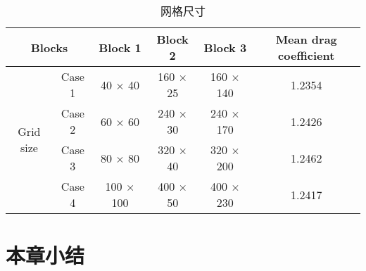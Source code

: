 \begin{table}[]
	\centering
	\caption{网格尺寸}\label{tab: grid}
	\begin{tabular}{@{}cccccc@{}}
		\toprule
		\multicolumn{2}{c}{Blocks}  & Block 1  & Block 2   & Block 3 & Mean drag coefficient    \\ \midrule
		\multirow{4}{*}{Grid size} 
		& Case 1 & 40 $\times$ 40 & 160 $\times$ 25 & 160 $\times$ 140   & 1.2354 \\
		& Case 2 & 60 $\times$ 60 & 240 $\times$ 30 & 240 $\times$ 170   & 1.2426 \\
		& Case 3 & 80 $\times$ 80 & 320 $\times$ 40 & 320 $\times$ 200   & 1.2462 \\
		& Case 4 & 100 $\times$ 100 & 400 $\times$ 50 & 400 $\times$ 230 & 1.2417 \\
		\bottomrule
	\end{tabular}
\end{table}

\section{本章小结}
